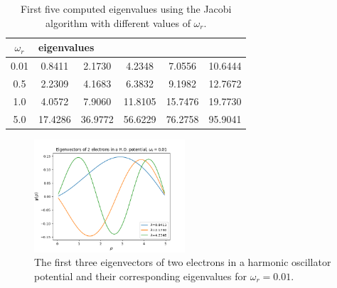 \documentclass[notitlepage, reprint, nofootinbib]{revtex4-1}
\begin{document}
\newpage
\begin{table}[h!]
\centering
\begin{tabular}{|c|c|c|c|c|c|}
\hline
$\omega_r$ & \multicolumn{5}{l|}{eigenvalues} \\ \hline
0.01 & 0.8411 & 2.1730 & 4.2348 & 7.0556 & 10.6444 \\ \hline
0.5 & 2.2309 & 4.1683 & 6.3832 & 9.1982 & 12.7672 \\ \hline
1.0 & 4.0572 & 7.9060 & 11.8105 & 15.7476 & 19.7730 \\ \hline
5.0 & 17.4286 & 36.9772 & 56.6229 & 76.2758 & 95.9041 \\ \hline
\end{tabular}
\caption{First five computed eigenvalues using the Jacobi algorithm with different values of $\omega_r$.}
\label{lambda_table}
\end{table}
\begin{figure}[h!]
	\centering
	\includegraphics[width=0.5\textwidth]{../Figures/eigvec_qdots2_0.png}
	\caption{The first three eigenvectors of two electrons in a harmonic oscillator potential and their corresponding eigenvalues for $\omega_r=0.01$.}
	\label{2dots_vector}
\end{figure}
\clearpage
\end{document}
